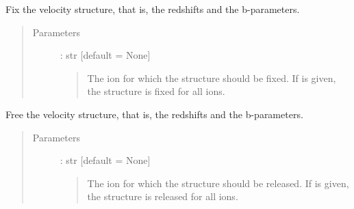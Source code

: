 \documentclass[letterpaper,10pt,english]{sphinxmanual}
\begin{document}
\begin{fulllineitems}
\begin{fulllineitems}
\begin{quote}
\begin{description}
\end{description}\end{quote}

\end{fulllineitems}


\begin{fulllineitems}
\label{\detokenize{api:VoigtFit.DataSet.fix_structure}}
Fix the velocity structure, that is, the redshifts and the b-parameters.
\begin{quote}\begin{description}
\item[{Parameters}] \leavevmode
{} : str   {[}default = None{]}
\begin{quote}

The ion for which the structure should be fixed.
If  is given, the structure is fixed for all ions.
\end{quote}

\end{description}\end{quote}

\end{fulllineitems}


\begin{fulllineitems}
\label{\detokenize{api:VoigtFit.DataSet.free_structure}}
Free the velocity structure, that is, the redshifts and the b-parameters.
\begin{quote}\begin{description}
\item[{Parameters}] \leavevmode
{} : str   {[}default = None{]}
\begin{quote}

The ion for which the structure should be released.
If  is given, the structure is released for all ions.
\end{quote}

\end{description}\end{quote}

\end{fulllineitems}


\end{fulllineitems}
\end{document}
